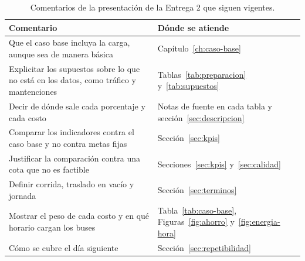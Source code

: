 \begin{table}[H]
\centering
\caption{Comentarios de la presentación de la Entrega 2 que siguen vigentes.}
\label{tab:corr-presentacion}
\footnotesize
\begin{tabularx}{\textwidth}{@{}X p{5.2cm}@{}}
\toprule
Comentario & Dónde se atiende \\
\midrule
Que el caso base incluya la carga, aunque sea de manera básica & Capítulo~\ref{ch:caso-base} \\
Explicitar los supuestos sobre lo que no está en los datos, como tráfico y mantenciones & Tablas~\ref{tab:preparacion} y~\ref{tab:supuestos} \\
Decir de dónde sale cada porcentaje y cada costo & Notas de fuente en cada tabla y sección~\ref{sec:descripcion} \\
Comparar los indicadores contra el caso base y no contra metas fijas & Sección~\ref{sec:kpis} \\
Justificar la comparación contra una cota que no es factible & Secciones~\ref{sec:kpis} y~\ref{sec:calidad} \\
Definir corrida, traslado en vacío y jornada & Sección~\ref{sec:terminos} \\
Mostrar el peso de cada costo y en qué horario cargan los buses & Tabla~\ref{tab:caso-base}, Figuras~\ref{fig:ahorro} y~\ref{fig:energia-hora} \\
Cómo se cubre el día siguiente & Sección~\ref{sec:repetibilidad} \\
\bottomrule
\end{tabularx}
\end{table}

